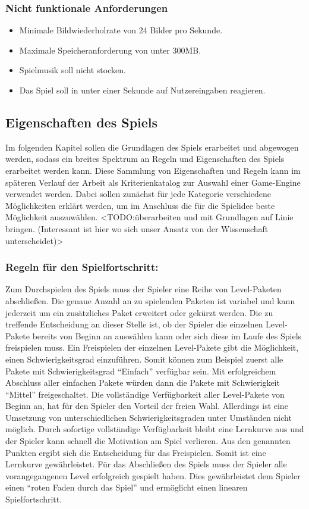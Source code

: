 	\subsubsection{Nicht funktionale Anforderungen}
		\begin{itemize}
			\item{ Minimale Bildwiederholrate von 24 Bilder pro Sekunde. }
			\item{ Maximale Speicheranforderung von unter 300MB. }
			\item{ Spielmusik soll nicht stocken. }
			\item{ Das Spiel soll in unter einer Sekunde auf Nutzereingaben reagieren. }
		\end{itemize}

\subsection{Eigenschaften des Spiels}\label{sssec:spielmechanik}
	Im folgenden Kapitel sollen die Grundlagen des Spiels erarbeitet und abgewogen werden, sodass ein breites Spektrum an Regeln und Eigenschaften des Spiels erarbeitet werden kann. Diese Sammlung von Eigenschaften und Regeln kann im späteren Verlauf der Arbeit als Kriterienkatalog zur Auswahl einer Game-Engine verwendet werden. Dabei sollen zunächst für jede Kategorie verschiedene Möglichkeiten erklärt werden, um im Anschluss die für die Spielidee beste Möglichkeit auszuwählen.
	<TODO:überarbeiten und mit Grundlagen auf Linie bringen. (Interessant ist hier wo sich unser Ansatz von der Wissenschaft unterscheidet)>

	\subsubsection*{Regeln für den Spielfortschritt:}
		Zum Durchspielen des Spiels muss der Spieler eine Reihe von Level-Paketen abschließen. Die genaue Anzahl an zu spielenden Paketen ist variabel und kann jederzeit um ein zusätzliches Paket erweitert oder gekürzt werden. Die zu treffende Entscheidung an dieser Stelle ist, ob der Spieler die einzelnen Level-Pakete bereits von Beginn an auswählen kann oder sich diese im Laufe des Spiels freispielen muss. Ein Freispielen der einzelnen Level-Pakete gibt die Möglichkeit, einen Schwierigkeitsgrad einzuführen. Somit können zum Beispiel zuerst alle Pakete mit Schwierigkeitsgrad \enquote{Einfach} verfügbar sein. Mit erfolgreichem Abschluss aller einfachen Pakete würden dann die Pakete mit Schwierigkeit \enquote{Mittel} freigeschaltet.
		Die vollständige Verfügbarkeit aller Level-Pakete von Beginn an, hat für den Spieler den Vorteil der freien Wahl. Allerdings ist eine Umsetzung von unterschiedlichen Schwierigkeitsgraden unter Umständen nicht möglich. Durch sofortige vollständige Verfügbarkeit bleibt eine Lernkurve aus und der Spieler kann schnell die Motivation am Spiel verlieren.
		Aus den genannten Punkten ergibt sich die Entscheidung für das Freispielen. Somit ist eine Lernkurve gewährleistet. Für das Abschließen des Spiels muss der Spieler alle vorangegangenen Level erfolgreich gespielt haben. Dies gewährleistet dem Spieler einen \enquote{roten Faden durch das Spiel} und ermöglicht einen linearen Spielfortschritt.

